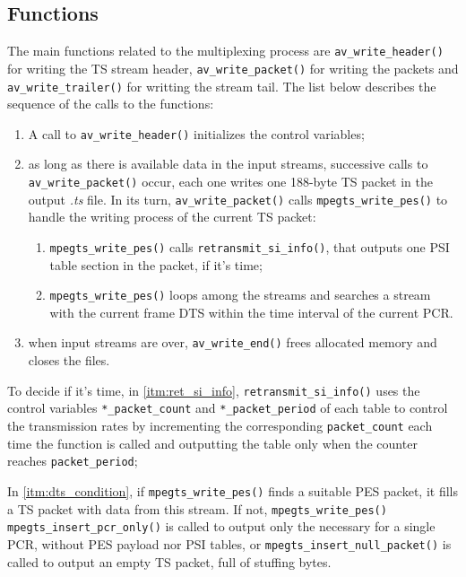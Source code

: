 \documentclass[
	12pt,				%
	openright,			%
	twoside,			%
	a4paper,			%
	brazil,
	french,				%
	english
	]{abntex2}
\begin{document}
\subsection{Functions}

The main functions related to the multiplexing process are \texttt{av\_write\_header()} for writing the TS stream header, \texttt{av\_write\_packet()} for writing the packets and \texttt{av\_write\_trailer()} for writting the stream tail. The list below describes the sequence of the calls to the functions:

\begin{enumerate}
	\item{A call to \texttt{av\_write\_header()} initializes the control variables;}
	\item{as long as there is available data in the input streams, successive calls to \texttt{av\_write\_packet()} occur, each one writes one 188-byte TS packet in the output \textit{.ts} file. In its turn, \texttt{av\_write\_packet()} calls \texttt{mpegts\_write\_pes()} to handle the writing process of the current TS packet:}
	\begin{enumerate}
		\item {\label{itm:ret_si_info} \texttt{mpegts\_write\_pes()} calls  \texttt{retransmit\_si\_info()}, that outputs one PSI table section in the packet, if it's time;}
		\item {\label{itm:dts_condition} \texttt{mpegts\_write\_pes()} loops among the streams and searches a stream with the current frame DTS within the time interval of the current PCR.}
	\end{enumerate}
	\item{when input streams are over, \texttt{av\_write\_end()} frees allocated memory and closes the files.}
\end{enumerate}

To decide if it's time, in \autoref{itm:ret_si_info}, \texttt{retransmit\_si\_info()} uses the control variables \texttt{*\_packet\_count} and \texttt{*\_packet\_period} of each table to control the transmission rates by incrementing the corresponding \texttt{packet\_count} each time the function is called and outputting the table only when the counter reaches \texttt{packet\_period};

In \autoref{itm:dts_condition}, if \texttt{mpegts\_write\_pes()} finds a suitable PES packet, it fills a TS packet with data from this stream. If not, \texttt{mpegts\_write\_pes()} \texttt{mpegts\_insert\_pcr\_only()} is called to output only the necessary for a single PCR, without PES payload nor PSI tables, or \texttt{mpegts\_insert\_null\_packet()} is called to output an empty TS packet, full of stuffing bytes.
\end{document}
